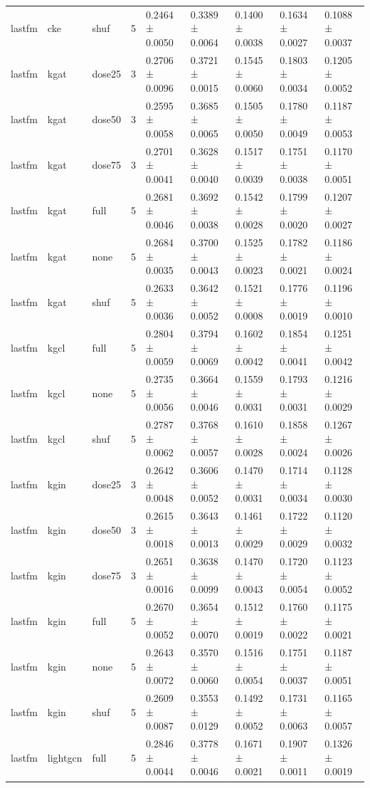 \begin{table}[t]
\begin{tabular}{lllllllll}
lastfm & cke & shuf & 5 & 0.2464 ± 0.0050 & 0.3389 ± 0.0064 & 0.1400 ± 0.0038 & 0.1634 ± 0.0027 & 0.1088 ± 0.0037 \\
lastfm & kgat & dose25 & 3 & 0.2706 ± 0.0096 & 0.3721 ± 0.0015 & 0.1545 ± 0.0060 & 0.1803 ± 0.0034 & 0.1205 ± 0.0052 \\
lastfm & kgat & dose50 & 3 & 0.2595 ± 0.0058 & 0.3685 ± 0.0065 & 0.1505 ± 0.0050 & 0.1780 ± 0.0049 & 0.1187 ± 0.0053 \\
lastfm & kgat & dose75 & 3 & 0.2701 ± 0.0041 & 0.3628 ± 0.0040 & 0.1517 ± 0.0039 & 0.1751 ± 0.0038 & 0.1170 ± 0.0051 \\
lastfm & kgat & full & 5 & 0.2681 ± 0.0046 & 0.3692 ± 0.0038 & 0.1542 ± 0.0028 & 0.1799 ± 0.0020 & 0.1207 ± 0.0027 \\
lastfm & kgat & none & 5 & 0.2684 ± 0.0035 & 0.3700 ± 0.0043 & 0.1525 ± 0.0023 & 0.1782 ± 0.0021 & 0.1186 ± 0.0024 \\
lastfm & kgat & shuf & 5 & 0.2633 ± 0.0036 & 0.3642 ± 0.0052 & 0.1521 ± 0.0008 & 0.1776 ± 0.0019 & 0.1196 ± 0.0010 \\
lastfm & kgcl & full & 5 & 0.2804 ± 0.0059 & 0.3794 ± 0.0069 & 0.1602 ± 0.0042 & 0.1854 ± 0.0041 & 0.1251 ± 0.0042 \\
lastfm & kgcl & none & 5 & 0.2735 ± 0.0056 & 0.3664 ± 0.0046 & 0.1559 ± 0.0031 & 0.1793 ± 0.0031 & 0.1216 ± 0.0029 \\
lastfm & kgcl & shuf & 5 & 0.2787 ± 0.0062 & 0.3768 ± 0.0057 & 0.1610 ± 0.0028 & 0.1858 ± 0.0024 & 0.1267 ± 0.0026 \\
lastfm & kgin & dose25 & 3 & 0.2642 ± 0.0048 & 0.3606 ± 0.0052 & 0.1470 ± 0.0031 & 0.1714 ± 0.0034 & 0.1128 ± 0.0030 \\
lastfm & kgin & dose50 & 3 & 0.2615 ± 0.0018 & 0.3643 ± 0.0013 & 0.1461 ± 0.0029 & 0.1722 ± 0.0029 & 0.1120 ± 0.0032 \\
lastfm & kgin & dose75 & 3 & 0.2651 ± 0.0016 & 0.3638 ± 0.0099 & 0.1470 ± 0.0043 & 0.1720 ± 0.0054 & 0.1123 ± 0.0052 \\
lastfm & kgin & full & 5 & 0.2670 ± 0.0052 & 0.3654 ± 0.0070 & 0.1512 ± 0.0019 & 0.1760 ± 0.0022 & 0.1175 ± 0.0021 \\
lastfm & kgin & none & 5 & 0.2643 ± 0.0072 & 0.3570 ± 0.0060 & 0.1516 ± 0.0054 & 0.1751 ± 0.0037 & 0.1187 ± 0.0051 \\
lastfm & kgin & shuf & 5 & 0.2609 ± 0.0087 & 0.3553 ± 0.0129 & 0.1492 ± 0.0052 & 0.1731 ± 0.0063 & 0.1165 ± 0.0057 \\
lastfm & lightgcn & full & 5 & 0.2846 ± 0.0044 & 0.3778 ± 0.0046 & 0.1671 ± 0.0021 & 0.1907 ± 0.0011 & 0.1326 ± 0.0019 \\

\end{tabular}
\end{table}
